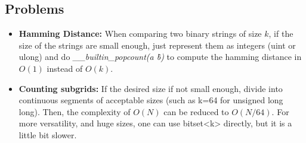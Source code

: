     \subsection{Problems}
    
    \begin{itemize}
        \item \textbf{Hamming Distance:} When comparing two binary strings of size $k$, if the size of the strings are small enough, 
        just represent them as integers (uint or ulong) and do \textit{\_\_builtin\_popcount(a \^ b)} to compute the hamming distance in $O(1)$ instead of $O(k)$.

        \item \textbf{Counting subgrids:} If the desired size if not small enough, divide into continuous segments of acceptable sizes (such as k=64 for unsigned long long).
        Then, the complexity of $O(N)$ can be reduced to $O(N/64)$. For more versatility, and huge sizes, one can use bitset<k> directly, but it is a little bit slower.

    \end{itemize}